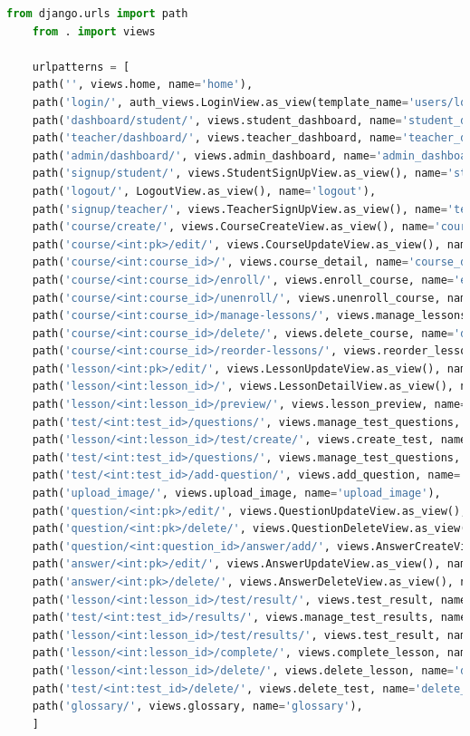 \begin{lstlisting}[language=Python, caption=Маршруты приложения, label=lst:urls]
	from django.urls import path
	from . import views
	
	urlpatterns = [
	path('', views.home, name='home'),
	path('login/', auth_views.LoginView.as_view(template_name='users/login.html'), name='login'),
	path('dashboard/student/', views.student_dashboard, name='student_dashboard'),
	path('teacher/dashboard/', views.teacher_dashboard, name='teacher_dashboard'),
	path('admin/dashboard/', views.admin_dashboard, name='admin_dashboard'),
	path('signup/student/', views.StudentSignUpView.as_view(), name='student_signup'),
	path('logout/', LogoutView.as_view(), name='logout'),
	path('signup/teacher/', views.TeacherSignUpView.as_view(), name='teacher_signup'),
	path('course/create/', views.CourseCreateView.as_view(), name='course_create'),
	path('course/<int:pk>/edit/', views.CourseUpdateView.as_view(), name='course_edit'),
	path('course/<int:course_id>/', views.course_detail, name='course_detail'),
	path('course/<int:course_id>/enroll/', views.enroll_course, name='enroll_course'),
	path('course/<int:course_id>/unenroll/', views.unenroll_course, name='unenroll_course'),
	path('course/<int:course_id>/manage-lessons/', views.manage_lessons, name='manage_lessons'),
	path('course/<int:course_id>/delete/', views.delete_course, name='delete_course'),
	path('course/<int:course_id>/reorder-lessons/', views.reorder_lessons, name='reorder_lessons'),
	path('lesson/<int:pk>/edit/', views.LessonUpdateView.as_view(), name='lesson_edit'),
	path('lesson/<int:lesson_id>/', views.LessonDetailView.as_view(), name='lesson_detail'),
	path('lesson/<int:lesson_id>/preview/', views.lesson_preview, name='lesson_preview'),
	path('test/<int:test_id>/questions/', views.manage_test_questions, name='manage_test_questions'),
	path('lesson/<int:lesson_id>/test/create/', views.create_test, name='create_test'),
	path('test/<int:test_id>/questions/', views.manage_test_questions, name='manage_test_questions'),
	path('test/<int:test_id>/add-question/', views.add_question, name='add_question'),
	path('upload_image/', views.upload_image, name='upload_image'),
	path('question/<int:pk>/edit/', views.QuestionUpdateView.as_view(), name='edit_question'),
	path('question/<int:pk>/delete/', views.QuestionDeleteView.as_view(), name='delete_question'),
	path('question/<int:question_id>/answer/add/', views.AnswerCreateView.as_view(), name='add_answer'),
	path('answer/<int:pk>/edit/', views.AnswerUpdateView.as_view(), name='edit_answer'),
	path('answer/<int:pk>/delete/', views.AnswerDeleteView.as_view(), name='delete_answer'),
	path('lesson/<int:lesson_id>/test/result/', views.test_result, name='test_result'),
	path('test/<int:test_id>/results/', views.manage_test_results, name='manage_test_results'),
	path('lesson/<int:lesson_id>/test/results/', views.test_result, name='test_results'),
	path('lesson/<int:lesson_id>/complete/', views.complete_lesson, name='complete_lesson'),
	path('lesson/<int:lesson_id>/delete/', views.delete_lesson, name='delete_lesson'),
	path('test/<int:test_id>/delete/', views.delete_test, name='delete_test'),
	path('glossary/', views.glossary, name='glossary'),
	]
\end{lstlisting}